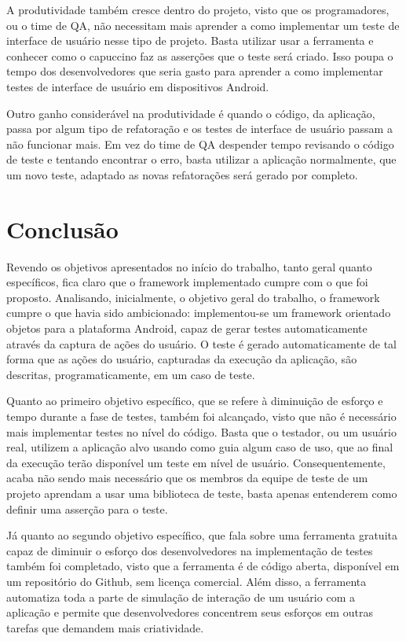 \documentclass[
    12pt,       %
    openright,      %
    twoside,      %
    a4paper,      %
    english,      %
    french,       %
    spanish,      %
    brazil,       %
    ]{abntex2}
\begin{document}
      A produtividade também cresce dentro do projeto, visto que os programadores, ou o time de QA, não
      necessitam mais aprender a como implementar um teste de interface de usuário nesse tipo de projeto.
      Basta utilizar usar a ferramenta e conhecer como o capuccino faz as asserções que o teste será criado.
      Isso poupa o tempo dos desenvolvedores que seria gasto para aprender a como implementar testes de
      interface de usuário em dispositivos Android.

      Outro ganho considerável na produtividade é quando o código, da aplicação, passa por algum tipo de
      refatoração e os testes de interface de usuário passam a não funcionar mais. Em vez do time de QA
      despender tempo revisando o código de teste e tentando encontrar o erro, basta utilizar a aplicação
      normalmente, que um novo teste, adaptado as novas refatorações será gerado por completo.

    \chapter{Conclusão}
      Revendo os objetivos apresentados no início do trabalho, tanto geral quanto específicos, fica claro
      que o framework implementado cumpre com o que foi proposto. Analisando, inicialmente, o objetivo
      geral do trabalho, o framework cumpre o que havia sido ambicionado: implementou-se um framework
      orientado objetos para a plataforma Android, capaz de gerar testes automaticamente através da captura
      de ações do usuário. O teste é gerado automaticamente de tal forma que as ações do usuário, capturadas
      da execução da aplicação, são descritas, programaticamente, em um caso de teste.

      Quanto ao primeiro objetivo específico, que se refere à diminuição de esforço e tempo durante a fase de
      testes, também foi alcançado, visto que não é necessário mais implementar testes no nível do código.
      Basta que o testador, ou um usuário real, utilizem a aplicação alvo usando como guia algum caso de uso,
      que ao final da execução terão disponível um teste em nível de usuário. Consequentemente, acaba não sendo
      mais necessário que os membros da equipe de teste de um projeto aprendam a usar uma biblioteca de teste,
      basta apenas entenderem como definir uma asserção para o teste.

      Já quanto ao segundo objetivo específico, que fala sobre uma ferramenta gratuita capaz de diminuir
      o esforço dos desenvolvedores na implementação de testes também foi completado, visto que a ferramenta
      é de código aberta, disponível em um repositório do Github, sem licença comercial. Além disso, a
      ferramenta automatiza toda a parte de simulação de interação de um usuário com a aplicação e permite
      que desenvolvedores concentrem seus esforços em outras tarefas que demandem mais criatividade.
\end{document}
